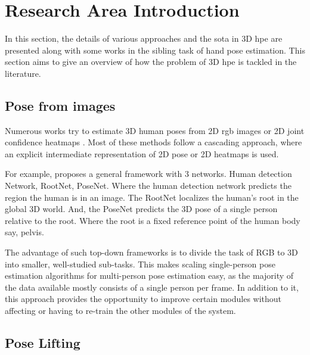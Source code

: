 
\section{Research Area Introduction}

\label{sec:Research area introduction}

In this section, the details of various approaches and the \ac{sota} in 3D \ac{hpe} are presented along with some works in the sibling task of hand pose estimation. This section aims to give an overview of how the problem of 3D \ac{hpe} is tackled in the literature.

\subsection{Pose from images}

Numerous works try to estimate 3D human poses from 2D \ac{rgb} images or 2D joint confidence heatmaps \cite{CameraDistanceAware, poselifter, DistillNRSfM, occlusionVideo, ordinalranking}. Most of these methods follow a cascading approach, where an explicit intermediate representation of 2D pose or 2D heatmaps is used.

For example, \cite{CameraDistanceAware} proposes a general framework with 3 networks. Human detection Network, RootNet, PoseNet. Where the human
detection network predicts the region the human is in an image. The RootNet localizes the human's root in the global 3D world. And, the PoseNet
predicts the 3D pose of a single person relative to the root. Where the root is a fixed reference point of the human body say, pelvis.

The advantage of such top-down frameworks is to divide the task of RGB to 3D into smaller, well-studied sub-tasks. This makes scaling single-person
pose estimation algorithms for multi-person pose estimation easy, as the majority of the data available mostly consists of a single person per
frame. In addition to it, this approach provides the opportunity to improve certain modules without affecting or having to re-train the other modules
of the system.

\subsection{Pose Lifting}

